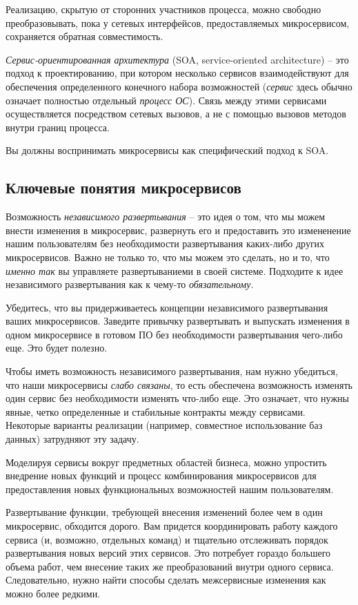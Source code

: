 \documentclass[%
	11pt,
	a4paper,
	utf8,
		]{article}
\begin{document}
Реализацию, скрытую от сторонних участников процесса, можно свободно преобразовывать, пока у сетевых интерфейсов, предоставляемых микросервисом, сохраняется обратная совместимость. 

\emph{Сервис-ориентированная архитектура} (SOA, service-oriented architecture) -- это подход к проектированию, при котором несколько сервисов взаимодействуют для обеспечения определенного конечного набора возможностей (\emph{сервис} здесь обычно означает полностью отдельный \emph{процесс ОС}). Связь между этими сервисами осуществляется посредством сетевых вызовов, а не с помощью вызовов методов внутри границ процесса.

Вы должны воспринимать микросервисы как специфический подход к SOA.

\subsection{Ключевые понятия микросервисов}

Возможность \emph{независимого развертывания} -- это идея о том, что мы можем внести изменения в микросервис, развернуть его и предоставить это измененение нашим пользователям без необходимости развертывания каких-либо других микросервисов. Важно не только то, что мы можем это сделать, но и то, что \emph{именно так} вы управляете развертываниеми в своей системе. Подходите к идее независимого развертывания как к чему-то \emph{обязательному}.

Убедитесь, что вы придерживаетесь концепции независимого развертывания ваших микросервисов. Заведите привычку развертывать и выпускать изменения в одном микросервисе в готовом ПО без необходимости развертывания чего-либо еще. Это будет полезно.

Чтобы иметь возможность независимого развертывания, нам нужно убедиться, что наши микросервисы \emph{слабо связаны}, то есть обеспечена возможность изменять один сервис без необходимости изменять что-либо еще. Это означает, что нужны явные, четко определенные и стабильные контракты между сервисами. Некоторые варианты реализации (например, совместное использование баз данных) затрудняют эту задачу.

Моделируя сервисы вокруг предметных областей бизнеса, можно упростить внедрение новых функций и процесс комбинирования микросервисов для предоставления новых функциональных возможностей нашим пользователям.

Развертывание функции, требующей внесения изменений более чем в один микросервис, обходится дорого. Вам придется координировать работу каждого сервиса (и, возможно, отдельных команд) и тщательно отслеживать порядок развертывания новых версий этих сервисов. Это потребует гораздо большего объема работ, чем внесение таких же преобразований внутри одного сервиса. Следовательно, нужно найти способы сделать межсервисные изменения как можно более редкими.
\end{document}
